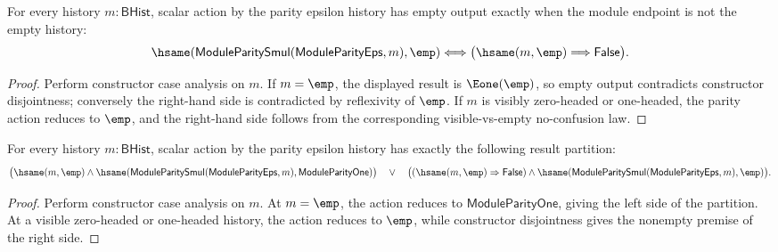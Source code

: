 \begin{theorem}
\label{thm:module-parity-smul-epsilon-empty-result-iff}
For every history $m:\mathsf{BHist}$, scalar action by the parity epsilon
history has empty output exactly when the module endpoint is not the empty
history:
$$
\hsame(\mathsf{ModuleParitySmul}(\mathsf{ModuleParityEps},m),\emp)
\Longleftrightarrow
\bigl(\hsame(m,\emp)\Longrightarrow\mathsf{False}\bigr).
$$
\end{theorem}
\begin{proof}
Perform constructor case analysis on $m$. If $m=\emp$, the displayed result is
$\Eone(\emp)$, so empty output contradicts constructor disjointness; conversely
the right-hand side is contradicted by reflexivity of $\emp$. If $m$ is visibly
zero-headed or one-headed, the parity action reduces to $\emp$, and the
right-hand side follows from the corresponding visible-vs-empty no-confusion
law.
\end{proof}

\begin{theorem}
\label{thm:module-parity-smul-epsilon-result-partition}
For every history $m:\mathsf{BHist}$, scalar action by the parity epsilon
history has exactly the following result partition:
$$
\bigl(\hsame(m,\emp)\land
  \hsame(\mathsf{ModuleParitySmul}(\mathsf{ModuleParityEps},m),
    \mathsf{ModuleParityOne})\bigr)
\quad\lor\quad
\bigl((\hsame(m,\emp)\Rightarrow\mathsf{False})\land
  \hsame(\mathsf{ModuleParitySmul}(\mathsf{ModuleParityEps},m),\emp)\bigr).
$$
\end{theorem}
\begin{proof}
Perform constructor case analysis on $m$. At $m=\emp$, the action reduces to
$\mathsf{ModuleParityOne}$, giving the left side of the partition. At a visible
zero-headed or one-headed history, the action reduces to $\emp$, while
constructor disjointness gives the nonempty premise of the right side.
\end{proof}

